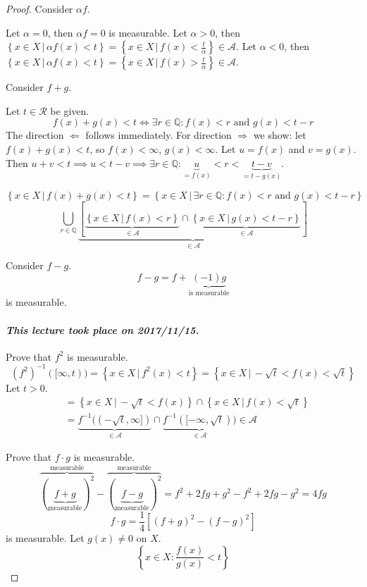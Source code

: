 \documentclass{article}
\newcommand{\set}[1]{\left\{#1\right\}}
\newcommand{\setdef}[2]{\left\{\left.#1\,\right|\,#2\right\}}
\newcommand{\dateref}[1]{\paragraph{\textit{This lecture took place on #1.}}}
\begin{document}
\begin{proof}
  Consider $\alpha f$.

  Let $\alpha = 0$, then $\alpha f = 0$ is measurable.
  Let $\alpha > 0$, then $\setdef{x \in X}{\alpha f(x) < t} = \setdef{x \in X}{f(x) < \frac{t}{\alpha}} \in \mathcal A$.
  Let $\alpha < 0$, then $\setdef{x \in X}{\alpha f(x) < t} = \setdef{x \in X}{f(x) > \frac{t}{\alpha}} \in \mathcal A$.

  Consider $f + g$.

  Let $t \in \mathcal R$ be given.
  \[ f(x) + g(x) < t \Leftrightarrow \exists r \in \mathbb Q: f(x) < r \text{ and } g(x) < t - r \]
  The direction $\Leftarrow$ follows immediately.
  For direction $\Rightarrow$ we show:
  let $f(x) + g(x) < t$, so $f(x) < \infty$, $g(x) < \infty$. Let $u = f(x)$ and $v = g(x)$.
  Then $u + v < t \implies u < t - v \implies \exists r \in \mathbb Q: \underbrace{u}_{=f(x)} < r < \underbrace{t - v}_{= t - g(x)}$.

  \[ \setdef{x \in X}{f(x) + g(x) < t} = \setdef{x \in X}{\exists r \in \mathbb Q: f(x) < r \text{ and } g(x) < t - r} \]
  \[ \bigcup_{r \in \mathbb Q}
  	\underbrace{\left[
  		\underbrace{\setdef{x \in X}{f(x) < r}}_{\in \mathcal A} \cap
  		\underbrace{\setdef{x \in X}{g(x) < t - r}}_{\in \mathcal A}
  	\right]}_{\in \mathcal A}
  \]

  Consider $f - g$.
  \[ f - g = f + \underbrace{(-1) g}_{\text{is measurable}} \]
  is measurable.

  \dateref{2017/11/15}

  Prove that $f^2$ is measurable.
  \[ (f^2)^{-1}([\infty, t)) = \setdef{x \in X}{f^2(x) < t} = \setdef{x \in X}{-\sqrt{t} < f(x) < \sqrt{t}} \]
  Let $t > 0$.
  \begin{align*}
    &= \setdef{x \in X}{-\sqrt{t} < f(x)} \cap \setdef{x \in X}{f(x) < \sqrt{t}} \\
    &= \underbrace{f^{-1}((-\sqrt{t}, \infty])}_{\in \mathcal A} \cap \underbrace{f^{-1}([-\infty, \sqrt{t}))}_{\in \mathcal A} \in \mathcal A
  \end{align*}

  Prove that $f \cdot g$ is measurable.
  \[ \overbrace{(\underbrace{f + g}_{\text{measurable}})^2}^{\text{measurable}} - \overbrace{(\underbrace{f - g}_{\text{measurable}})^2}^{\text{measurable}} = f^2 + 2fg + g^2 - f^2 + 2fg - g^2 = 4fg \]
  \[ f \cdot g = \frac14 \left[(f + g)^2 - (f - g)^2\right] \]
  is measurable. Let $g(x) \neq 0$ on $X$.
  \[ \set{x \in X: \frac{f(x)}{g(x)} < t} \]


\end{proof}
\end{document}
